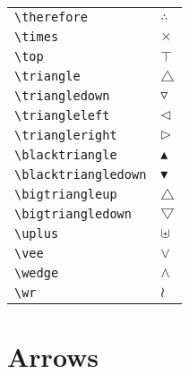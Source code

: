\documentclass[text,xhtml,itex]{internet}
\begin{document}
\begin{tabular}{ll}
\verb+\therefore+ & \(\therefore\) \\
\verb+\times+ & \(\times\) \\
\verb+\top+                   & \(\top\) \\
\verb+\triangle+ & \(\triangle\) \\
\verb+\triangledown+ & \(\triangledown\) \\
\verb+\triangleleft+ & \(\triangleleft\) \\
\verb+\triangleright+ & \(\triangleright\) \\
\verb+\blacktriangle+ & \(\blacktriangle\) \\
\verb+\blacktriangledown+ & \(\blacktriangledown\) \\
\verb+\bigtriangleup+ & \(\bigtriangleup\) \\
\verb+\bigtriangledown+ & \(\bigtriangledown\) \\
\verb+\uplus+ & \(\uplus\) \\
\verb+\vee+ & \(\vee\) \\
\verb+\wedge+                 & \(\wedge\) \\
\verb+\wr+ & \(\wr\)
\end{tabular}


\section{Arrows}
\end{document}
